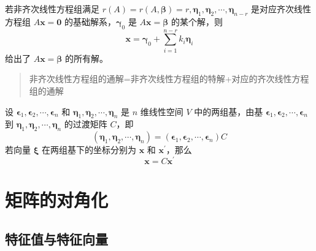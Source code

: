 \documentclass{ctexbook}
\begin{document}
\begin{theorem}[非齐次线性方程组的解]
    若非齐次线性方程组满足 $r(A)=r(A,\boldsymbol{\beta})=r,\boldsymbol{\eta}_1,\boldsymbol{\eta}_2,\cdots,\boldsymbol{\eta}_{n-r}$ 是对应齐次线性方程组 $A\boldsymbol{x}=\boldsymbol{0}$ 的基础解系，$\boldsymbol{\gamma}_0$ 是 $A\boldsymbol{x}=\boldsymbol{\beta}$ 的某个解，则
    \begin{equation}
        \boldsymbol{x}=\boldsymbol{\gamma}_0+\sum_{i=1}^{n-r}k_i\boldsymbol{\eta}_i
    \end{equation}
    给出了 $A\boldsymbol{x}=\boldsymbol{\beta}$ 的所有解。
    \begin{quote}\normalfont
        非齐次线性方程组的通解=非齐次线性方程组的特解+对应的齐次线性方程组的通解
    \end{quote}
\end{theorem}

\begin{definition}[过渡矩阵]
    设 $\boldsymbol{\epsilon}_1,\boldsymbol{\epsilon}_2,\cdots,\boldsymbol{\epsilon}_n$ 和 $\boldsymbol{\eta}_1,\boldsymbol{\eta}_2,\cdots,\boldsymbol{\eta}_n$ 是 $n$ 维线性空间 $V$ 中的两组基，由基 $\boldsymbol{\epsilon}_1,\boldsymbol{\epsilon}_2,\cdots,\boldsymbol{\epsilon}_n$ 到 $\boldsymbol{\eta}_1,\boldsymbol{\eta}_2,\cdots,\boldsymbol{\eta}_n$ 的过渡矩阵 $C$，即
    \begin{equation}
        (\boldsymbol{\eta}_1,\boldsymbol{\eta}_2,\cdots,\boldsymbol{\eta}_n) = (\boldsymbol{\epsilon}_1,\boldsymbol{\epsilon}_2,\cdots,\boldsymbol{\epsilon}_n)C
    \end{equation}
    若向量 $\boldsymbol{\xi}$ 在两组基下的坐标分别为 $\boldsymbol{x}$ 和 $\boldsymbol{x}^\prime$，那么
    \begin{equation}
        \boldsymbol{x}=C\boldsymbol{x}^\prime
    \end{equation}
\end{definition}

\chapter{矩阵的对角化}

\section{特征值与特征向量}
\end{document}
